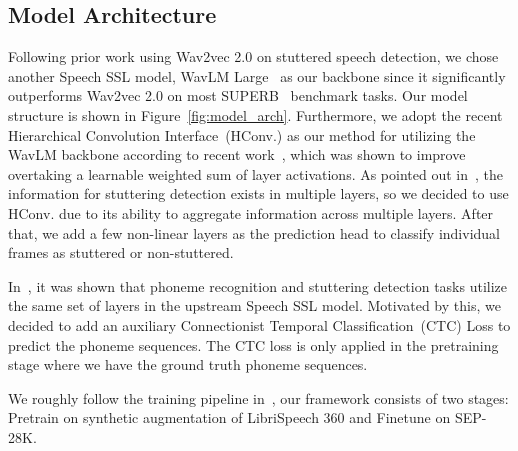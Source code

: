 \subsection{Model Architecture}
Following prior work using Wav2vec 2.0 on stuttered speech detection, we chose another Speech SSL model,  WavLM Large~\cite{Chen2021WavLMLS} as our backbone since it significantly outperforms Wav2vec 2.0 on most SUPERB~\cite{yang21c_superb} benchmark tasks.
Our model structure is shown in Figure~\ref{fig:model_arch}.
Furthermore, we adopt the recent Hierarchical Convolution Interface~(HConv.) as our method for utilizing the WavLM backbone according to recent work~\cite{shih_interface}, which was shown to improve overtaking a learnable weighted sum of layer activations.
As pointed out in~\cite{bayerl22b_interspeech}, the information for stuttering detection exists in multiple layers, so we decided to use HConv. due to its ability to aggregate information across multiple layers.
After that, we add a few non-linear layers as the prediction head to classify individual frames as stuttered or non-stuttered.

In~\cite{bayerl22b_interspeech}, it was shown that phoneme recognition and stuttering detection tasks utilize the same set of layers in the upstream Speech SSL model.
Motivated by this, we decided to add an auxiliary Connectionist Temporal Classification~(CTC) Loss to predict the phoneme sequences.
The CTC loss is only applied in the pretraining stage where we have the ground truth phoneme sequences.

We roughly follow the training pipeline in~\cite{harvill22_interspeech}, our framework consists of two stages: Pretrain on synthetic augmentation of LibriSpeech 360 and Finetune on SEP-28K.

